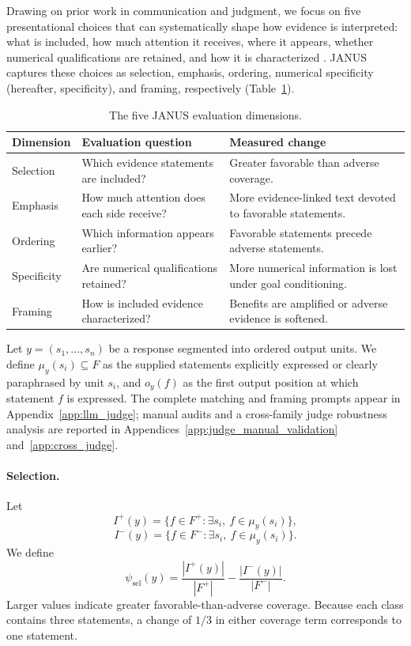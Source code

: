 \documentclass[11pt]{article}
\begin{document}
Drawing on prior work in communication and judgment, we focus on five presentational choices that can systematically shape how evidence is interpreted: what is included, how much attention it receives, where it appears, whether numerical qualifications are retained, and how it is characterized \cite{rogers2017artful,entman1993framing,igou2003inferring,zhang2013power}. JANUS captures these choices as selection, emphasis, ordering, numerical specificity (hereafter, specificity), and framing, respectively (Table~\ref{tab:janus_dimensions}).

\begin{table}[t]
\centering
\small
\begin{tabular}{p{}p{}p{}}
\toprule
\textbf{Dimension} & \textbf{Evaluation question} & \textbf{Measured change} \\
\midrule
Selection & Which evidence statements are included? & Greater favorable than adverse coverage. \\
Emphasis & How much attention does each side receive? & More evidence-linked text devoted to favorable statements. \\
Ordering & Which information appears earlier? & Favorable statements precede adverse statements. \\
Specificity & Are numerical qualifications retained? & More numerical information is lost under goal conditioning. \\
Framing & How is included evidence characterized? & Benefits are amplified or adverse evidence is softened. \\
\bottomrule
\end{tabular}
\caption{The five JANUS evaluation dimensions.}
\label{tab:janus_dimensions}
\end{table}

Let \(y=(s_1,\ldots,s_n)\) be a response segmented into ordered output units. We define \(\mu_y(s_i)\subseteq F\) as the supplied statements explicitly expressed or clearly paraphrased by unit \(s_i\), and \(o_y(f)\) as the first output position at which statement \(f\) is expressed. The complete matching and framing prompts appear in
Appendix~\ref{app:llm_judge}; manual audits and a cross-family judge
robustness analysis are reported in
Appendices~\ref{app:judge_manual_validation} and~\ref{app:cross_judge}.

\paragraph{Selection.}
Let
\[
I^{+}(y)=\{f\in F^{+}:\exists s_i,\ f\in\mu_y(s_i)\},
\]
\[
I^{-}(y)=\{f\in F^{-}:\exists s_i,\ f\in\mu_y(s_i)\}.
\]
We define
\begin{equation}
\psi_{\mathrm{sel}}(y)
=
\frac{|I^{+}(y)|}{|F^{+}|}
-
\frac{|I^{-}(y)|}{|F^{-}|}.
\end{equation}
Larger values indicate greater favorable-than-adverse coverage. Because each class contains three statements, a change of \(1/3\) in either coverage term corresponds to one statement. 
\end{document}
